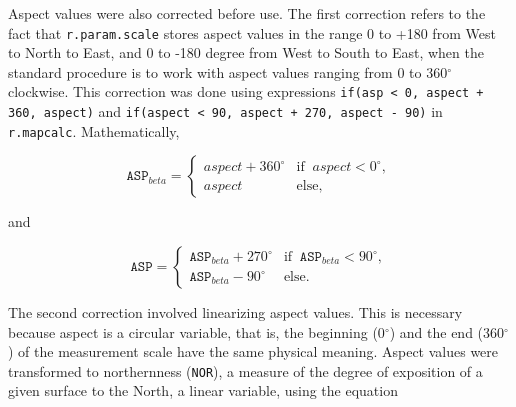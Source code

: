 
Aspect values were also corrected before use. The first correction refers to the fact that \texttt{r.param.scale} stores aspect values in the range 0 to +180 from West to North to East, and 0 to -180 degree from West to South to East, when the standard procedure is to work with aspect values ranging from 0 to 360$^\circ$ clockwise. This correction was done using expressions \texttt{if(asp < 0, aspect + 360, aspect)} and \texttt{if(aspect < 90, aspect + 270, aspect - 90)} in \texttt{r.mapcalc}. Mathematically,

\begin{equation}
  \texttt{ASP}_{beta} =
  \begin{cases}
    aspect + 360^\circ & \text{if}\;\; aspect < 0^\circ, \\
    aspect             & \text{else},
  \end{cases}
\end{equation}

\noindent and

\begin{equation}
  \texttt{ASP} =
  \begin{cases}
    \texttt{ASP}_{beta} + 270^\circ & \text{if}\;\; \texttt{ASP}_{beta} < 90^\circ, \\
    \texttt{ASP}_{beta} - 90^\circ  & \text{else}.
  \end{cases}
\end{equation}

\noindent The second correction involved linearizing aspect values. This is necessary because aspect is a circular variable, that is, the beginning (0$^\circ$) and the end (360$^\circ$) of the measurement scale have the same physical meaning. Aspect values were transformed to northernness (\texttt{NOR}), a measure of the degree of exposition of a given surface to the North, a linear variable, using the equation

